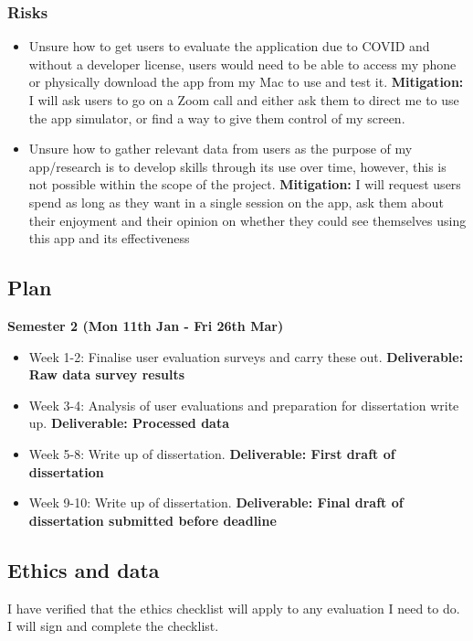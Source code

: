\documentclass[11pt]{article}
\begin{document}
\subsubsection{Risks}\label{risks}

\begin{itemize}
    \item Unsure how to get users to evaluate the application due to COVID and without a developer license, users would need to be able to access my phone or physically download the app from my Mac to use and test it. \textbf{Mitigation:} I will ask users to go on a Zoom call and either ask them to direct me to use the app simulator, or find a way to give them control of my screen.
    \item Unsure how to gather relevant data from users as the purpose of my app/research is to develop skills through its use over time, however, this is not possible within the scope of the project. \textbf{Mitigation:} I will request users spend as long as they want in a single session on the app, ask them about their enjoyment and their opinion on whether they could see themselves using this app and its effectiveness
\end{itemize}

\subsection{Plan}\label{plan}

\textbf{Semester 2 (Mon 11th Jan - Fri 26th Mar)}
\begin{itemize}
    \item Week 1-2: Finalise user evaluation surveys and carry these out. \textbf{Deliverable: Raw data survey results}
    \item Week 3-4: Analysis of user evaluations and preparation for dissertation write up. \textbf{Deliverable: Processed data}
    \item Week 5-8: Write up of dissertation. \textbf{Deliverable: First draft of dissertation}
    \item Week 9-10: Write up of dissertation. \textbf{Deliverable: Final draft of dissertation submitted before deadline}
\end{itemize}

    
\subsection{Ethics and data}\label{ethics}
I have verified that the ethics checklist will apply to any evaluation I need to do.  I will sign and complete the checklist.
  
\end{document}
